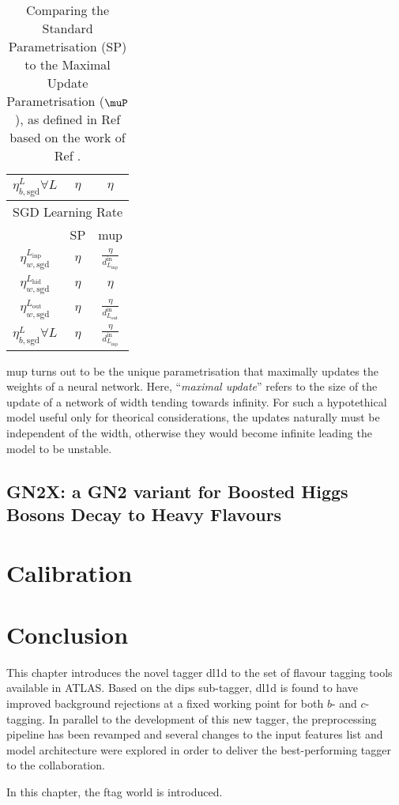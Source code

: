 \begin{table}[h]
\begin{center}
\begin{tabular}{c|c|c}
          $\eta_{b, \textrm{sgd}}^{L} \forall L$     & $\eta$ & $\eta$                                          \\  \hline \hline
          \multicolumn{3}{c}{SGD Learning Rate} \\ 
          & SP  & \gls{mup}  \\ \hline
          $\eta_{w, \textrm{sgd}}^{L_\textrm{inp}}$  & $\eta$ & $\frac{\eta}{d^{\textrm{in}}_{L_\textrm{inp}}}$ \\ 
          $\eta_{w, \textrm{sgd}}^{L_\textrm{hid}}$  & $\eta$ & $\eta$                                          \\ 
          $\eta_{w, \textrm{sgd}}^{L_\textrm{out}}$  & $\eta$ & $\frac{\eta}{d^{\textrm{in}}_{L_\textrm{out}}}$ \\
          $\eta_{b, \textrm{sgd}}^{L} \forall L$     & $\eta$ & $\frac{\eta}{d^{\textrm{in}}_{L_\textrm{inp}}}$ \\  \hline \hline
      \end{tabular}
    \caption{Comparing the Standard Parametrisation (SP) to the Maximal Update Parametrisation ($\muP$), as defined in Ref \cite{yang2021tuning} based on the work of Ref \cite{pmlr-v139-yang21c}.}
    \label{tab:max-perf}
  \end{center}
\end{table}

\gls{mup} turns out to be the unique parametrisation that maximally updates the weights of a neural network. Here, ``\textit{maximal update}'' refers to the size of the update of a network of width tending towards infinity. For such a hypotethical model useful only for theorical considerations, the updates naturally must be independent of the width, otherwise they would become infinite leading the model to be unstable. 



\subsection{GN2X: a GN2 variant for Boosted Higgs Bosons Decay to Heavy Flavours}\label{chap-GN2X}

\section{Calibration}

\section{Conclusion}
This chapter introduces the novel tagger \gls{dl1d} to the set of flavour tagging tools available in ATLAS. Based on the \gls{dips} sub-tagger, \gls{dl1d} is found to have improved background rejections at a fixed working point for both $b$- and $c$-tagging. In parallel to the development of this new tagger, the preprocessing pipeline has been revamped and several changes to the input features list and model architecture were explored in order to deliver the best-performing tagger to the collaboration. 
\clearpage


\begin{tcolorbox}[colback=oxfordblue!5,colframe=blue!40!black,title=Summary of the Chapter]
In this chapter, the \gls{ftag} world is introduced. 
\end{tcolorbox}